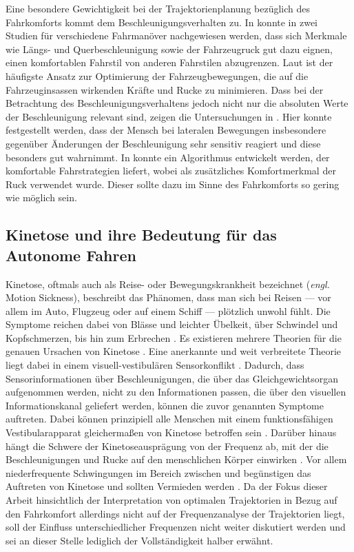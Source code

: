 Eine besondere Gewichtigkeit bei der Trajektorienplanung bezüglich des Fahrkomforts kommt dem Beschleunigungsverhalten zu. In \cite{Bellem.2016} konnte in zwei Studien für verschiedene Fahrmanöver nachgewiesen werden, dass sich Merkmale wie Längs- und Querbeschleunigung sowie der Fahrzeugruck gut dazu eignen, einen komfortablen Fahrstil von anderen Fahrstilen abzugrenzen. Laut \cite{Elbanhawi.2015} ist der häufigste Ansatz zur Optimierung der Fahrzeugbewegungen, die auf die Fahrzeuginsassen wirkenden Kräfte und Rucke zu minimieren. Dass bei der Betrachtung des Beschleunigungsverhaltens jedoch nicht nur die absoluten Werte der Beschleunigung relevant sind, zeigen die Untersuchungen in \cite{Gianna.1996}. Hier konnte festgestellt werden, dass der Mensch bei lateralen Bewegungen insbesondere gegenüber Änderungen der Beschleunigung sehr sensitiv reagiert und diese besonders gut wahrnimmt. In \cite{Dovgan.2013} konnte ein Algorithmus entwickelt werden, der komfortable Fahrstrategien liefert, wobei als zusätzliches Komfortmerkmal der Ruck verwendet wurde. Dieser sollte dazu im Sinne des Fahrkomforts so gering wie möglich sein.

\subsection{Kinetose und ihre Bedeutung für das Autonome Fahren}\label{sec:kinetose}
Kinetose, oftmals auch als Reise- oder Bewegungskrankheit bezeichnet (\textit{engl.} Motion Sickness), beschreibt das Phänomen, dass man sich bei Reisen --- vor allem im Auto, Flugzeug oder auf einem Schiff --- plötzlich unwohl fühlt. Die Symptome reichen dabei von Blässe und leichter Übelkeit, über Schwindel und Kopfschmerzen, bis hin zum Erbrechen \cite{Money.1970}. Es existieren mehrere Theorien für die genauen Ursachen von Kinetose \cite{Money.1970}. Eine anerkannte und weit verbreitete Theorie liegt dabei in einem visuell-vestibulären Sensorkonflikt \cite{Reason.1975,Golding.2006,Benson.2002}. Dadurch, dass Sensorinformationen über Beschleunigungen, die über das Gleichgewichtsorgan aufgenommen werden, nicht zu den Informationen passen, die über den visuellen Informationskanal geliefert werden, können die zuvor genannten Symptome auftreten. Dabei können prinzipiell alle Menschen mit einem funktionsfähigen Vestibularapparat gleichermaßen von Kinetose betroffen sein \cite{Lackner.2014}. Darüber hinaus hängt die Schwere der Kinetoseausprägung von der Frequenz ab, mit der die Beschleunigungen und Rucke auf den menschlichen Körper einwirken \cite{OHanlon.1974}. Vor allem niederfrequente Schwingungen im Bereich zwischen  und  begünstigen das Auftreten von Kinetose und sollten Vermieden werden \cite{OHanlon.1974,ISO.2631}. Da der Fokus dieser Arbeit hinsichtlich der Interpretation von optimalen Trajektorien in Bezug auf den Fahrkomfort allerdings nicht auf der Frequenzanalyse der Trajektorien liegt, soll der Einfluss unterschiedlicher Frequenzen nicht weiter diskutiert werden und sei an dieser Stelle lediglich der Vollständigkeit halber erwähnt.

